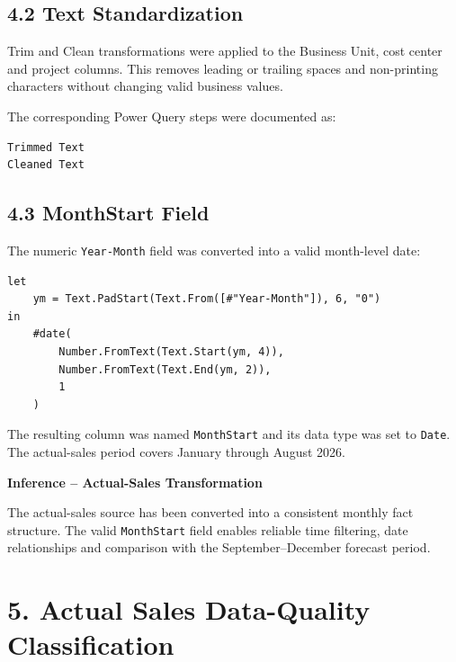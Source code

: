 \documentclass[11pt,a4paper]{article}
\begin{document}
\subsection{4.2 Text Standardization}

Trim and Clean transformations were applied to the Business Unit, cost
center and project columns. This removes leading or trailing spaces and
non-printing characters without changing valid business values.

The corresponding Power Query steps were documented as:

\begin{lstlisting}[style=powerquery]
Trimmed Text
Cleaned Text
\end{lstlisting}

\subsection{4.3 MonthStart Field}

The numeric \texttt{Year-Month} field was converted into a valid
month-level date:

\begin{lstlisting}[style=powerquery]
let
    ym = Text.PadStart(Text.From([#"Year-Month"]), 6, "0")
in
    #date(
        Number.FromText(Text.Start(ym, 4)),
        Number.FromText(Text.End(ym, 2)),
        1
    )
\end{lstlisting}

The resulting column was named \texttt{MonthStart} and its data type was
set to \texttt{Date}. The actual-sales period covers January through
August 2026.

\begin{inferencebox}

\textbf{Inference -- Actual-Sales Transformation}

The actual-sales source has been converted into a consistent monthly fact
structure. The valid \texttt{MonthStart} field enables reliable time filtering,
date relationships and comparison with the September--December forecast
period.

\end{inferencebox}


\section{5. Actual Sales Data-Quality Classification}
\end{document}
